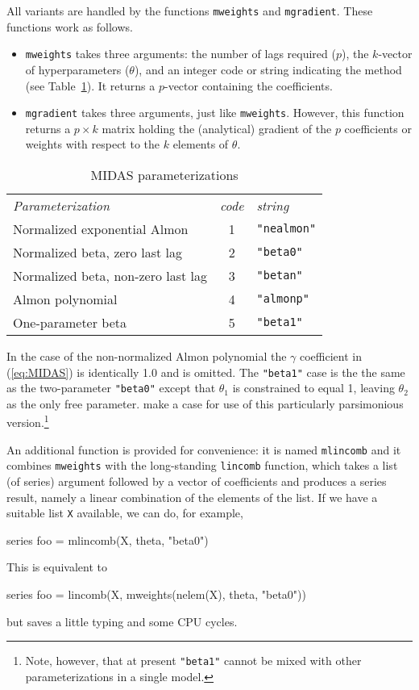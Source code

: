 All variants are handled by the functions \texttt{mweights} and
\texttt{mgradient}. These functions work as follows.
\begin{itemize}
\item \texttt{mweights} takes three arguments: the number of lags
  required ($p$), the $k$-vector of hyperparameters ($\theta$), and an
  integer code or string indicating the method (see
  Table~\ref{tab:midas-parm}). It returns a $p$-vector containing the
  coefficients.
\item \texttt{mgradient} takes three arguments, just like
  \texttt{mweights}. However, this function returns a $p \times k$
  matrix holding the (analytical) gradient of the $p$ coefficients or
  weights with respect to the $k$ elements of $\theta$.
\end{itemize}

\begin{table}[htbp]
  \centering
  \begin{tabular}{lcl}
    \textit{Parameterization} & 
      \textit{code} & \textit{string} \\[4pt]
    Normalized exponential Almon & 1 & \verb|"nealmon"| \\
    Normalized beta, zero last lag & 2 & \verb|"beta0"| \\
    Normalized beta, non-zero last lag & 3 & \verb|"betan"| \\
    Almon polynomial & 4 & \verb|"almonp"| \\
    One-parameter beta & 5 & \verb|"beta1"|
  \end{tabular}
  \caption{MIDAS parameterizations}
  \label{tab:midas-parm}
\end{table}
In the case of the non-normalized Almon polynomial the $\gamma$
coefficient in (\ref{eq:MIDAS}) is identically 1.0 and is omitted.
The \verb|"beta1"| case is the the same as the two-parameter
\verb|"beta0"| except that $\theta_1$ is constrained to equal 1,
leaving $\theta_2$ as the only free parameter. \cite{ghysels-qian16}
make a case for use of this particularly parsimonious
version.\footnote{Note, however, that at present \verb|"beta1"| cannot
  be mixed with other parameterizations in a single model.}

An additional function is provided for convenience: it is named
\texttt{mlincomb} and it combines \texttt{mweights} with the
long-standing \texttt{lincomb} function, which takes a list (of
series) argument followed by a vector of coefficients and produces a
series result, namely a linear combination of the elements of the
list. If we have a suitable list \texttt{X} available, we can
do, for example,
\begin{code}
series foo = mlincomb(X, theta, "beta0")
\end{code}
This is equivalent to
\begin{code}
series foo = lincomb(X, mweights(nelem(X), theta, "beta0"))
\end{code}
but saves a little typing and some CPU cycles.

